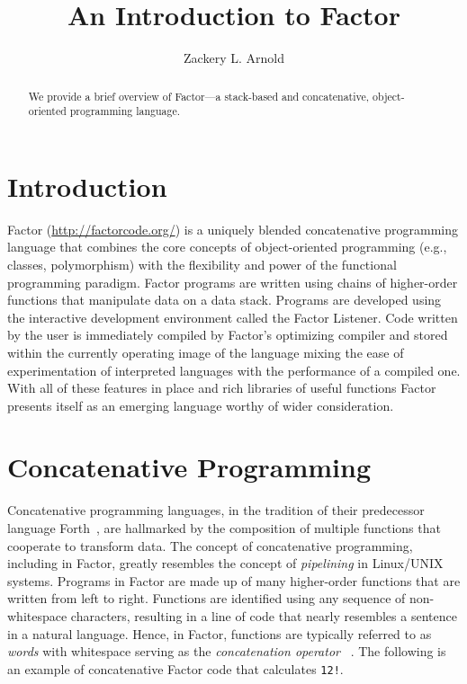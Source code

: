\documentclass[sigconf]{acmart}
\begin{document}
\title{An Introduction to Factor}
\author{Zackery L. Arnold}

\renewcommand{\shortauthors}{Z.L. Arnold}

\begin{abstract}
We provide a brief overview of Factor---a stack-based
and concatenative, object-oriented programming language.
\end{abstract}


\maketitle

\section{Introduction}

Factor (\url{http://factorcode.org/})
is a uniquely blended concatenative programming language 
that combines the core concepts of object-oriented programming 
(e.g., classes, polymorphism) with the flexibility and power 
of the functional programming paradigm. Factor programs are 
written using chains of higher-order functions that manipulate
data on a data stack. Programs are developed using
the interactive development environment called the Factor 
Listener. Code written by the user is immediately compiled by 
Factor's optimizing compiler and stored within the currently 
operating image of the language mixing the ease of
experimentation of interpreted languages with the performance 
of a compiled one. With all of these features in place and rich 
libraries of useful functions Factor presents itself as an 
emerging language worthy of wider consideration. 

\section{Concatenative Programming}

Concatenative programming languages, in the tradition of their
predecessor language Forth~\cite{koopman:forth}, are hallmarked
by the composition of multiple functions that cooperate to
transform data. The concept of concatenative programming,
including in Factor, greatly resembles the concept of 
\textit{pipelining} in Linux/UNIX systems. Programs in Factor 
are made up of many higher-order functions that are written 
from left to right. Functions are identified using any sequence 
of non-whitespace characters, resulting in a line of code that 
nearly resembles a sentence in a natural language. Hence, in 
Factor, functions are typically referred to as \textit{words} 
with whitespace serving as the \textit{concatenation operator}
~\cite{pestov:Factor}. The following is an example of 
concatenative Factor code that calculates \texttt{12!}.
\end{document}
